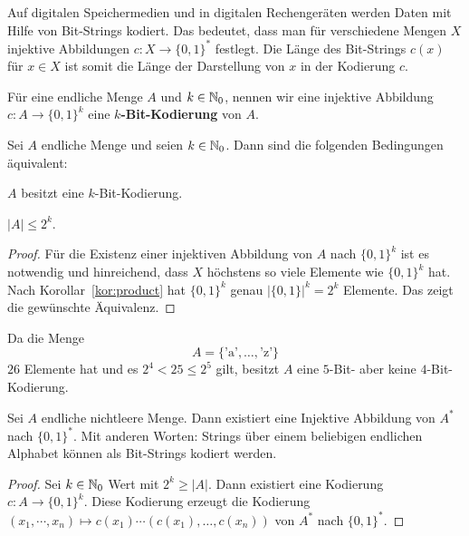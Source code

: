 \begin{bem}
	Auf digitalen Speichermedien und in digitalen Rechengeräten werden Daten mit Hilfe von Bit-Strings kodiert. Das bedeutet, dass man für verschiedene Mengen $X$ injektive Abbildungen $c : X \to \{0,1\}^\ast$ festlegt. Die Länge des Bit-Strings $c(x)$ für $x \in X$ ist somit die Länge der Darstellung von $x$ in der Kodierung $c$. 
\end{bem} 

\begin{defn}
	Für eine endliche Menge $A$ und $k \in \mathbb{N}_0$, nennen wir eine injektive Abbildung $c: A \to \{0,1\}^k$ eine \textbf{$k$-Bit-Kodierung} von $A$. 
\end{defn} 

\begin{prop}
Sei $A$ endliche Menge und seien $k \in \mathbb{N}_0$. Dann sind die folgenden Bedingungen äquivalent: 
\begin{enumi} 
	\item $A$ besitzt eine $k$-Bit-Kodierung.
	\item $ |A| \le 2^k$. 
\end{enumi} 
\end{prop} 
\begin{proof} 
	Für die Existenz einer injektiven Abbildung von $A$ nach $\{0,1\}^k$ ist es notwendig und hinreichend, dass $X$ höchstens so viele Elemente wie $\{0,1\}^k$ hat. Nach Korollar~\ref{kor:product}  hat $\{0,1\}^k$ genau $|\{0,1\}|^k = 2^k$ Elemente. Das zeigt die gewünschte Äquivalenz. 
\end{proof} 

\begin{bsp}
	Da die Menge 
	\[
		A = \{\text{'a'},\ldots,\text{'z'}\}
	\]
	$26$ Elemente hat und es $2^4 < 25 \le 2^5$ gilt, besitzt $A$ eine $5$-Bit- aber keine $4$-Bit-Kodierung. 
\end{bsp} 

\begin{prop} \label{prop:beliebiges:alphabet->01}
	Sei $A$ endliche nichtleere Menge. Dann existiert eine Injektive Abbildung von $A^\ast$ nach $\{0,1\}^\ast$. Mit anderen Worten: Strings über einem beliebigen endlichen Alphabet können als Bit-Strings kodiert werden. 
\end{prop} 
\begin{proof} 
	Sei $k \in \mathbb{N}_0$ Wert mit $2^k \ge |A|$. Dann existiert eine Kodierung $ c : A \to \{0,1\}^k$. Diese Kodierung erzeugt die Kodierung $(x_1, \cdots ,x_n) \mapsto c(x_1) \cdots (c(x_1),\ldots,c(x_n))$ von $A^\ast$ nach $\{0,1\}^\ast$. 
\end{proof} 


